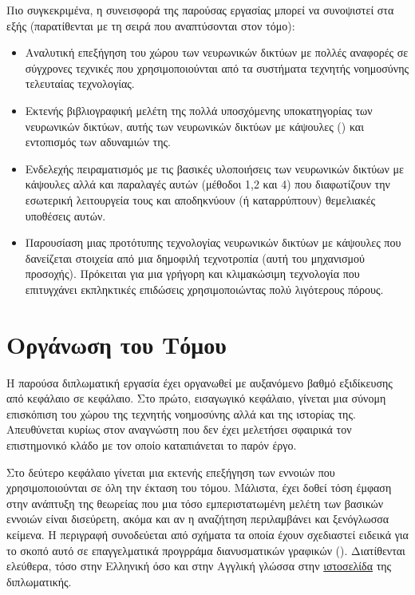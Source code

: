 Πιο συγκεκριμένα, η συνεισφορά της παρούσας εργασίας μπορεί να συνοψιστεί στα εξής (παρατίθενται με τη σειρά που αναπτύσονται στον τόμο):
\begin{itemize}
  \item Αναλυτική επεξήγηση του χώρου των νευρωνικών δικτύων με πολλές αναφορές σε σύγχρονες τεχνικές που χρησιμοποιούνται από τα συστήματα τεχνητής νοημοσύνης τελευταίας τεχνολογίας.
  \item Εκτενής βιβλιογραφική μελέτη της πολλά υποσχόμενης υποκατηγορίας των νευρωνικών δικτύων, αυτής των νευρωνικών δικτύων με κάψουλες () και εντοπισμός των αδυναμιών της.
  \item Ενδελεχής πειραματισμός με τις βασικές υλοποιήσεις των νευρωνικών δικτύων με κάψουλες αλλά και παραλαγές αυτών (μέθοδοι 1,2 και 4) που διαφωτίζουν την εσωτερική λειτουργεία τους και αποδηκνύουν (ή καταρρύπτουν) θεμελιακές υποθέσεις αυτών.
  \item Παρουσίαση μιας προτότυπης τεχνολογίας νευρωνικών δικτύων με κάψουλες που δανείζεται στοιχεία από μια δημοφιλή τεχνοτροπία (αυτή του μηχανισμού προσοχής). Πρόκειται για μια γρήγορη και κλιμακώσιμη τεχνολογία που επιτυγχάνει εκπληκτικές επιδώσεις χρησιμοποιώντας πολύ λιγότερους πόρους.
\end{itemize}

\section{Οργάνωση του Τόμου}
Η παρούσα διπλωματική εργασία έχει οργανωθεί με αυξανόμενο βαθμό εξιδίκευσης από κεφάλαιο σε κεφάλαιο. Στο πρώτο, εισαγωγικό κεφάλαιο, γίνεται μια σύνομη επισκόπιση του χώρου της τεχνητής νοημοσύνης αλλά και της ιστορίας της. Απευθύνεται κυρίως στον αναγνώστη που δεν έχει μελετήσει σφαιρικά τον επιστημονικό κλάδο με τον οποίο καταπιάνεται το παρόν έργο.\par

Στο δεύτερο κεφάλαιο γίνεται μια εκτενής επεξήγηση των εννοιών που χρησιμοποιούνται σε όλη την έκταση του τόμου. Μάλιστα, έχει δοθεί τόση έμφαση στην ανάπτυξη της θεωρείας που μια τόσο εμπεριστατωμένη μελέτη των βασικών εννοιών είναι δισεύρετη, ακόμα και αν η αναζήτηση περιλαμβάνει και ξενόγλωσσα κείμενα. Η περιγραφή συνοδεύεται από σχήματα τα οποία έχουν σχεδιαστεί ειδεικά για το σκοπό αυτό σε επαγγελματικά προγρράμα διανυσματικών γραφικών (). Διατίθενται ελεύθερα, τόσο στην Ελληνική όσο και στην Αγγλική γλώσσα στην \href{https://github.com/abarmper/Thesis_Barmperis}{ιστοσελίδα} της διπλωματικής.\par

